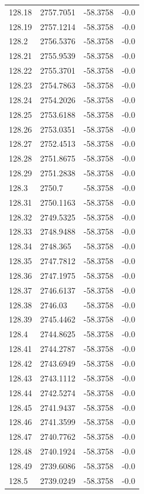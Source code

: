 \begin{table}[H]
\begin{tabular}{llll}
128.18 & 2757.7051 & -58.3758 & -0.0 \\
128.19 & 2757.1214 & -58.3758 & -0.0 \\
128.2 & 2756.5376 & -58.3758 & -0.0 \\
128.21 & 2755.9539 & -58.3758 & -0.0 \\
128.22 & 2755.3701 & -58.3758 & -0.0 \\
128.23 & 2754.7863 & -58.3758 & -0.0 \\
128.24 & 2754.2026 & -58.3758 & -0.0 \\
128.25 & 2753.6188 & -58.3758 & -0.0 \\
128.26 & 2753.0351 & -58.3758 & -0.0 \\
128.27 & 2752.4513 & -58.3758 & -0.0 \\
128.28 & 2751.8675 & -58.3758 & -0.0 \\
128.29 & 2751.2838 & -58.3758 & -0.0 \\
128.3 & 2750.7 & -58.3758 & -0.0 \\
128.31 & 2750.1163 & -58.3758 & -0.0 \\
128.32 & 2749.5325 & -58.3758 & -0.0 \\
128.33 & 2748.9488 & -58.3758 & -0.0 \\
128.34 & 2748.365 & -58.3758 & -0.0 \\
128.35 & 2747.7812 & -58.3758 & -0.0 \\
128.36 & 2747.1975 & -58.3758 & -0.0 \\
128.37 & 2746.6137 & -58.3758 & -0.0 \\
128.38 & 2746.03 & -58.3758 & -0.0 \\
128.39 & 2745.4462 & -58.3758 & -0.0 \\
128.4 & 2744.8625 & -58.3758 & -0.0 \\
128.41 & 2744.2787 & -58.3758 & -0.0 \\
128.42 & 2743.6949 & -58.3758 & -0.0 \\
128.43 & 2743.1112 & -58.3758 & -0.0 \\
128.44 & 2742.5274 & -58.3758 & -0.0 \\
128.45 & 2741.9437 & -58.3758 & -0.0 \\
128.46 & 2741.3599 & -58.3758 & -0.0 \\
128.47 & 2740.7762 & -58.3758 & -0.0 \\
128.48 & 2740.1924 & -58.3758 & -0.0 \\
128.49 & 2739.6086 & -58.3758 & -0.0 \\
128.5 & 2739.0249 & -58.3758 & -0.0 \\

\end{tabular}
\end{table}
